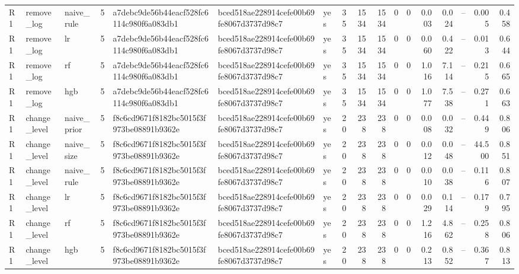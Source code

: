 \begin{table}[htbp]
{\begin{tabular}{lllrlllrrrrrrrrrr}
R1 & remove\_log & naive\_rule & 5 & a7debc9de56b44eacf528fc6114c980f6a083db1 & bced518ae228914cefe00b69fe8067d3737d98c7 & yes & 35 & 1534 & 1534 & 0 & 0 & 0.003 & 0.024 & -- & 0.005 & 0.458 \\
R1 & remove\_log & lr & 5 & a7debc9de56b44eacf528fc6114c980f6a083db1 & bced518ae228914cefe00b69fe8067d3737d98c7 & yes & 35 & 1534 & 1534 & 0 & 0 & 0.060 & 0.422 & -- & 0.013 & 0.644 \\
R1 & remove\_log & rf & 5 & a7debc9de56b44eacf528fc6114c980f6a083db1 & bced518ae228914cefe00b69fe8067d3737d98c7 & yes & 35 & 1534 & 1534 & 0 & 0 & 1.016 & 7.114 & -- & 0.215 & 0.665 \\
R1 & remove\_log & hgb & 5 & a7debc9de56b44eacf528fc6114c980f6a083db1 & bced518ae228914cefe00b69fe8067d3737d98c7 & yes & 35 & 1534 & 1534 & 0 & 0 & 1.077 & 7.538 & -- & 0.271 & 0.663 \\
R1 & change\_level & naive\_prior & 5 & f8c6cd9671f8182bc5015f3f973be08891b9362e & bced518ae228914cefe00b69fe8067d3737d98c7 & yes & 20 & 238 & 238 & 0 & 0 & 0.008 & 0.032 & -- & 0.449 & 0.806 \\
R1 & change\_level & naive\_size & 5 & f8c6cd9671f8182bc5015f3f973be08891b9362e & bced518ae228914cefe00b69fe8067d3737d98c7 & yes & 20 & 238 & 238 & 0 & 0 & 0.012 & 0.048 & -- & 44.500 & 0.851 \\
R1 & change\_level & naive\_rule & 5 & f8c6cd9671f8182bc5015f3f973be08891b9362e & bced518ae228914cefe00b69fe8067d3737d98c7 & yes & 20 & 238 & 238 & 0 & 0 & 0.010 & 0.038 & -- & 0.116 & 0.807 \\
R1 & change\_level & lr & 5 & f8c6cd9671f8182bc5015f3f973be08891b9362e & bced518ae228914cefe00b69fe8067d3737d98c7 & yes & 20 & 238 & 238 & 0 & 0 & 0.029 & 0.114 & -- & 0.179 & 0.795 \\
R1 & change\_level & rf & 5 & f8c6cd9671f8182bc5015f3f973be08891b9362e & bced518ae228914cefe00b69fe8067d3737d98c7 & yes & 20 & 238 & 238 & 0 & 0 & 1.216 & 4.862 & -- & 0.258 & 0.806 \\
R1 & change\_level & hgb & 5 & f8c6cd9671f8182bc5015f3f973be08891b9362e & bced518ae228914cefe00b69fe8067d3737d98c7 & yes & 20 & 238 & 238 & 0 & 0 & 0.213 & 0.852 & -- & 0.367 & 0.813 \\
\bottomrule
\end{tabular}}
\end{table}
